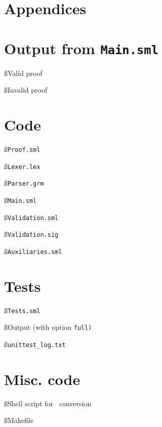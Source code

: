 \documentclass[a4paper]{article}
\begin{document}
\label{LastBody}
\pagebreak
{}


\label{LastBio}
\clearpage
\appendix
\section*{Appendices}\label{FirstApp}
\renewcommand \thesubsection{\alph{subsection}}
\renewcommand \thesubsubsection{\roman{subsubsection}}

\section{Output from \tt{Main.sml}}\label{output}
\ss{Valid proof}

\ss{Invalid proof}

\section{Code}\label{code}
\ss{\tt{Proof.sml}}\label{Proof}

\ss{\tt{Lexer.lex}}\label{Lexer}

\ss{\tt{Parser.grm}}\label{Parser}

\ss{\tt{Main.sml}}\label{Main}

\ss{\tt{Validation.sml}}\label{Validation.sml}

\ss{\tt{Validation.sig}}\label{Validation.sig}

\ss{\tt{Auxiliaries.sml}}\label{Auxiliaries}

\section{Tests}\label{tests}
\ss{\tt{Tests.sml}}\label{Test}

\ss{Output (with option \tt{full})}\label{testout}

\ss{\tt{unittest\_log.txt}}\label{log}

\section{Misc. code}\label{misc}
\ss{Shell script for \bp\ conversion}

\label{LastPage} %
\ss{Makefile}\label{mkfile}
\label{LastApp}
\end{document}

